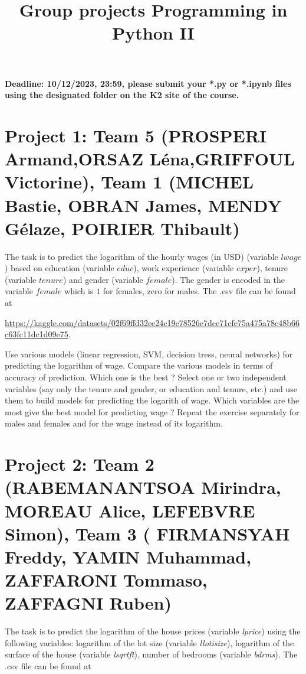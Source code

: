 \documentclass{article}
\title{Group projects Programming in Python II}
\author{}
\date{}
\begin{document}
\maketitle

\textbf{Deadline: 10/12/2023, 23:59,  please submit your *.py or *.ipynb files using the designated folder on the K2 site of the course.}


\section*{Project 1: Team 5 (PROSPERI Armand,ORSAZ Léna,GRIFFOUL Victorine), Team 1 (MICHEL	Bastie, OBRAN	James,
MENDY Gélaze, POIRIER	Thibault) }

  The task is to  predict the logarithm of the hourly wages (in USD) (variable $lwage$) based on education (variable $educ$), work experience (variable $exper$), tenure (variable $tenure$) and gender (variable $female$). The gender is encoded in the variable $female$ which is $1$ for   females, zero for males. 
 The .csv file can be found at 
 
 \url{https://kaggle.com/datasets/02f69ffd32ee24c19c78526e7dee71cfe75a475a78c48b66c63fc11dc1d09e75}. 

 Use various models (linear regression, SVM, decision tress, neural networks) for predicting the logarithm of  wage. Compare the various models in terms of accuracy of prediction. Which one is the best ? 
 Select one or two independent variables (say only the tenure and gender, or education and tenure, etc.)  and use them to build models for predicting the logarith of wage. Which variables are the most
 give the best model for predicting  wage ? Repeat the exercise separately for males and females and for the wage instead of its logarithm. 




 \section*{Project 2:  Team 2 (RABEMANANTSOA	Mirindra, MOREAU	Alice,
LEFEBVRE Simon), Team 3 ( FIRMANSYAH	Freddy, YAMIN	Muhammad, ZAFFARONI Tommaso, ZAFFAGNI Ruben)}

  The task is to predict the logarithm of the house prices (variable \emph{lprice}) using the following variables:
  logarithm of the lot size (variable \emph{llotisize}), logarithm of the surface of the house (variable \emph{lsqrtft}), number of bedrooms (variable \emph{bdrms}). 	
   The .csv file can be found at
\end{document}
